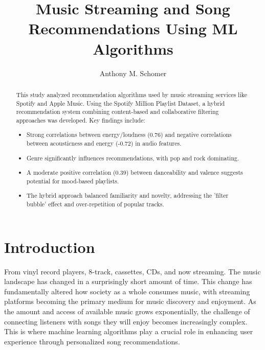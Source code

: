 \documentclass[runningheads]{llncs}
\begin{document}
\title{Music Streaming and Song Recommendations Using ML Algorithms}

\author{Anthony M. Schomer}



\maketitle

\begin{abstract}
This study analyzed recommendation algorithms used by music streaming services like Spotify and Apple Music. Using the Spotify Million Playlist Dataset, a hybrid recommendation system combining content-based and collaborative filtering approaches was developed. Key findings include:
\begin{itemize}
  \item Strong correlations between energy/loudness (0.76) and negative correlations between acousticness and energy (-0.72) in audio features.
  \item Genre significantly influences recommendations, with pop and rock dominating.
  \item A moderate positive correlation (0.39) between danceability and valence suggests potential for mood-based playlists.
  \item The hybrid approach balanced familiarity and novelty, addressing the 'filter bubble' effect and over-repetition of popular tracks.
\end{itemize}
\end{abstract}

\section{Introduction}

From vinyl record players, 8-track, cassettes, CDs, and now streaming. The music landscape has changed in a surprisingly short amount of time. This change has fundamentally altered how society as a whole consumes music, with streaming platforms becoming the primary medium for music discovery and enjoyment. As the amount and access of available music grows exponentially, the challenge of connecting listeners with songs they will enjoy becomes increasingly complex. This is where machine learning algorithms play a crucial role in enhancing user experience through personalized song recommendations.
\end{document}
